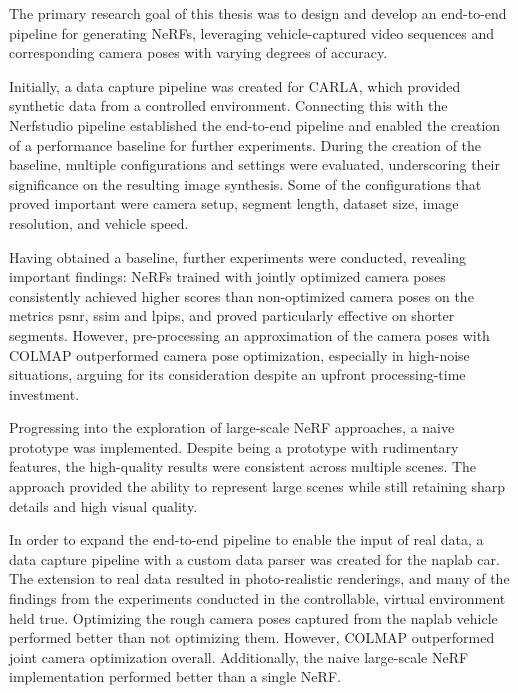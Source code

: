 

The primary research goal of this thesis was to design and develop an end-to-end pipeline for generating NeRFs, leveraging vehicle-captured video sequences and corresponding camera poses with varying degrees of accuracy.

Initially, a data capture pipeline was created for CARLA, which provided synthetic data from a controlled environment. Connecting this with the Nerfstudio pipeline established the end-to-end pipeline and enabled the creation of a performance baseline for further experiments. During the creation of the baseline, multiple configurations and settings were evaluated, underscoring their significance on the resulting image synthesis. Some of the configurations that proved important were camera setup, segment length, dataset size, image resolution, and vehicle speed.

Having obtained a baseline, further experiments were conducted, revealing important findings: NeRFs trained with jointly optimized camera poses consistently achieved higher scores than non-optimized camera poses on the metrics \acrshort{psnr}, \acrshort{ssim} and \acrshort{lpips}, and proved particularly effective on shorter segments. However, pre-processing an approximation of the camera poses with COLMAP outperformed camera pose optimization, especially in high-noise situations, arguing for its consideration despite an upfront processing-time investment.

Progressing into the exploration of large-scale NeRF approaches, a naive prototype was implemented. Despite being a prototype with rudimentary features, the high-quality results were consistent across multiple scenes. The approach provided the ability to represent large scenes while still retaining sharp details and high visual quality.

In order to expand the end-to-end pipeline to enable the input of real data, a data capture pipeline with a custom data parser was created for the \acrshort{naplab} car. The extension to real data resulted in photo-realistic renderings, and many of the findings from the experiments conducted in the controllable, virtual environment held true. Optimizing the rough camera poses captured from the \acrshort{naplab} vehicle performed better than not optimizing them. However, COLMAP outperformed joint camera optimization overall. Additionally, the naive large-scale NeRF implementation performed better than a single NeRF.

